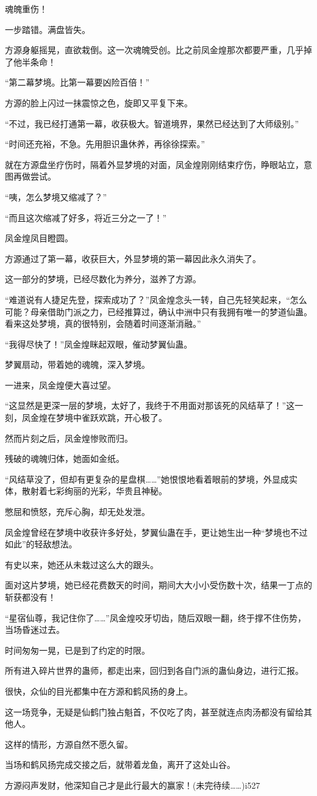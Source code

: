 \begin{this_body}
魂魄重伤！

一步踏错。满盘皆失。

方源身躯摇晃，直欲栽倒。这一次魂魄受创。比之前凤金煌那次都要严重，几乎掉了他半条命！

“第二幕梦境。比第一幕要凶险百倍！”

方源的脸上闪过一抹震惊之色，旋即又平复下来。

“不过，我已经打通第一幕，收获极大。智道境界，果然已经达到了大师级别。”

“时间还充裕，不急。先用胆识蛊休养，再徐徐探索。”

就在方源盘坐疗伤时，隔着外显梦境的对面，凤金煌刚刚结束疗伤，睁眼站立，意图再做尝试。

“咦，怎么梦境又缩减了？”

“而且这次缩减了好多，将近三分之一了！”

凤金煌凤目瞪圆。

方源通过了第一幕，收获巨大，外显梦境的第一幕因此永久消失了。

这一部分的梦境，已经尽数化为养分，滋养了方源。

“难道说有人捷足先登，探索成功了？”凤金煌念头一转，自己先轻笑起来，“怎么可能？母亲借助门派之力，已经推算过，确认中洲中只有我拥有唯一的梦道仙蛊。看来这处梦境，真的很特别，会随着时间逐渐消融。”

“我得尽快了！”凤金煌眯起双眼，催动梦翼仙蛊。

梦翼扇动，带着她的魂魄，深入梦境。

一进来，凤金煌便大喜过望。

“这显然是更深一层的梦境，太好了，我终于不用面对那该死的风结草了！”这一刻，凤金煌在梦境中雀跃欢跳，开心极了。

然而片刻之后，凤金煌惨败而归。

残破的魂魄归体，她面如金纸。

“风结草没了，但却有更复杂的星盘棋……”她恨恨地看着眼前的梦境，外显成实体，散射着七彩绚丽的光彩，华贵且神秘。

憋屈和愤怒，充斥心胸，却无处发泄。

凤金煌曾经在梦境中收获许多好处，梦翼仙蛊在手，更让她生出一种“梦境也不过如此”的轻敌想法。

有史以来，她还从未栽过这么大的跟头。

面对这片梦境，她已经花费数天的时间，期间大大小小受伤数十次，结果一丁点的斩获都没有！

“星宿仙尊，我记住你了……”凤金煌咬牙切齿，随后双眼一翻，终于撑不住伤势，当场昏迷过去。

时间匆匆一晃，已是到了约定的时限。

所有进入碎片世界的蛊师，都走出来，回归到各自门派的蛊仙身边，进行汇报。

很快，众仙的目光都集中在方源和鹤风扬的身上。

这一场竞争，无疑是仙鹤门独占魁首，不仅吃了肉，甚至就连点肉汤都没有留给其他人。

这样的情形，方源自然不愿久留。

当场和鹤风扬完成交接之后，就带着龙鱼，离开了这处山谷。

方源闷声发财，他深知自己才是此行最大的赢家！(未完待续……)i527

\end{this_body}

